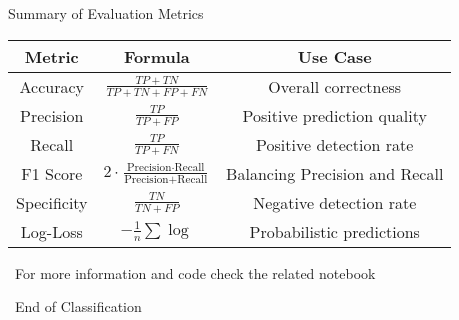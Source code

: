 \documentclass[serif, aspectratio=169]{beamer}
\begin{document}
\begin{frame}{Summary of Evaluation Metrics}
\begin{table}[]
\centering
\begin{tabular}{|c|c|c|}
\hline
\textbf{Metric} & \textbf{Formula} & \textbf{Use Case} \\\hline
Accuracy & \(\frac{TP + TN}{TP + TN + FP + FN}\) & Overall correctness \\\hline
Precision & \(\frac{TP}{TP + FP}\) & Positive prediction quality \\\hline
Recall & \(\frac{TP}{TP + FN}\) & Positive detection rate \\\hline
F1 Score & \(2 \cdot \frac{\text{Precision} \cdot \text{Recall}}{\text{Precision} + \text{Recall}}\) & Balancing Precision and Recall \\\hline
Specificity & \(\frac{TN}{TN + FP}\) & Negative detection rate \\\hline
Log-Loss & $-\frac{1}{n} \sum \log$ & Probabilistic predictions \\\hline
\end{tabular}
\end{table}
\end{frame}



\begin{frame}
    \begin{center}
        {\Huge\ \color{red}For more information and code check the related notebook}
    \end{center}
\end{frame}


\begin{frame}
    \begin{center}
        {\Huge\ End of Classification}
    \end{center}
\end{frame}
\end{document}
